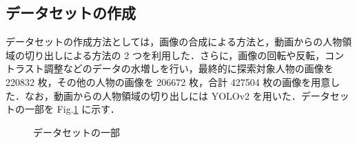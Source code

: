\documentclass[twocolumn,10pt]{jarticle}
\begin{document}
\subsection{データセットの作成}
データセットの作成方法としては，画像の合成による方法と，動画からの人物領域の切り出しによる方法の 2 つを利用した．さらに，画像の回転や反転，コントラスト調整などのデータの水増しを行い，最終的に探索対象人物の画像を 220832 枚，その他の人物の画像を 206672 枚，合計 427504 枚の画像を用意した．なお，動画からの人物領域の切り出しには YOLOv2 を用いた．データセットの一部を Fig.\ref{fig:dataset} に示す．
\begin{figure}[t]
\begin{center}
\hspace{0.7cm}
\caption{データセットの一部}
\label{fig:dataset}
\end{center}
\end{figure}
\end{document}
